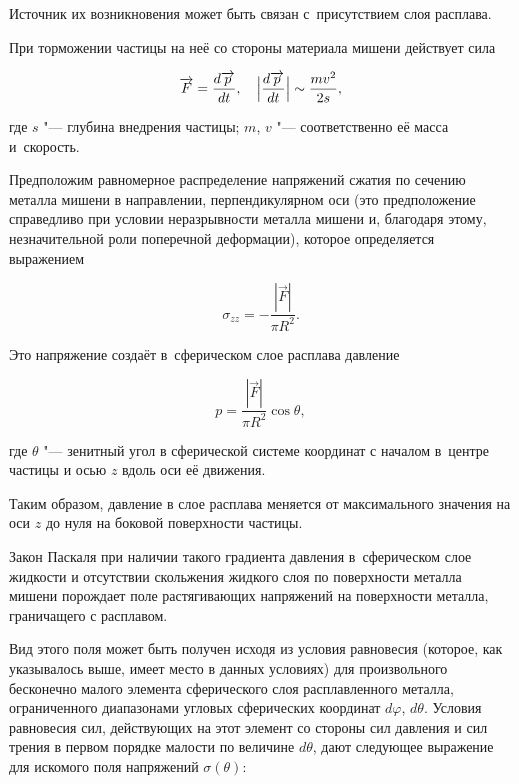 Источник их возникновения может быть связан с~присутствием слоя расплава.

При торможении частицы на неё со стороны материала мишени действует  сила

\begin{equation*}

\overrightarrow{F}=\frac{d\overrightarrow{p}}{dt}, \quad  

\Bigl|\frac{d\overrightarrow{p}}{dt}\Bigr|\sim\frac{mv^{2}}{2s},

\end{equation*}

где   $s $ "--- глубина внедрения частицы; $m$, $v $ "--- соответственно её масса и~скорость.

Предположим равномерное распределение напряжений сжатия по сечению металла мишени в направлении, перпендикулярном оси   (это предположение справедливо при условии неразрывности металла мишени и, благодаря этому, незначительной роли поперечной деформации), которое определяется выражением

\begin{equation*}

\sigma_{zz}=-\frac{|\overrightarrow{F}|}{\pi R^{2}}.

\end{equation*}

Это напряжение создаёт в~сферическом слое расплава давление

 \begin{equation*}

p=\frac{|\overrightarrow{F}|}{\pi R^{2}}\cos\theta,

\end{equation*}

где $\theta $ "---  зенитный угол в сферической системе координат с началом в~центре частицы и осью $z$  вдоль оси её движения. 

Таким образом, давление в слое расплава меняется от максимального значения на оси $z $ до нуля на боковой поверхности частицы. 

Закон Паскаля при наличии такого градиента давления в~сферическом слое жидкости и отсутствии скольжения жидкого слоя по поверхности металла мишени порождает поле растягивающих напряжений на поверхности металла, граничащего с расплавом.

Вид этого поля может быть получен исходя из условия равновесия (которое, как указывалось выше, имеет место в данных условиях) для произвольного бесконечно малого элемента сферического слоя расплавленного металла, ограниченного диапазонами угловых сферических координат $d\varphi$, $d\theta $. Условия равновесия сил, действующих на этот элемент со стороны сил давления  и сил трения в первом порядке малости по величине $d\theta $, дают следующее выражение для искомого поля напряжений $\sigma(\theta) $:


